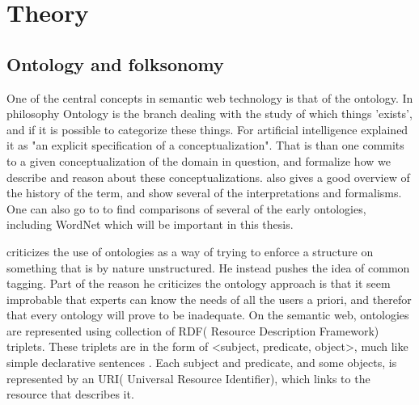 
\chapter{Theory} %
\label{Theory} %


\section{Ontology and folksonomy}
One of the central concepts in semantic web technology is that of the ontology. 
In philosophy Ontology is the branch dealing with the study of which things 'exists', and if it is possible to categorize these things. 
For artificial intelligence \citet{Gruber1993} explained it as "an explicit specification of a conceptualization". 
That is than one commits to a given conceptualization of the domain in question, and formalize how we describe and reason about these conceptualizations. 
\citet{Pretorius2004} also gives a good overview of the history of the term, and show several of the interpretations and formalisms. 
One can also go to \citet{Noy1997} to find comparisons of several of the early ontologies, including WordNet which will be important in this thesis.

\citet{Shirky2007} criticizes the use of ontologies as a way of trying to enforce a structure on something that is by nature unstructured. 
He instead pushes the idea of common tagging. 
Part of the reason he criticizes the ontology approach is that it seem improbable that experts can know the needs of all the users a priori, and therefor that every ontology will prove to be inadequate.
On the semantic web, ontologies are represented using collection of RDF( Resource Description Framework) triplets. 
These triplets are in the form of <subject, predicate, object>, much like simple declarative sentences \citep{Berners-Lee2001}. 
Each subject and predicate, and some objects, is represented by an URI( Universal Resource Identifier), which links to the resource that describes it.

